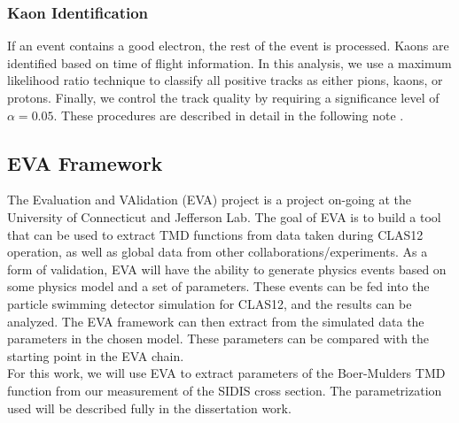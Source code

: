 \subsubsection{Kaon Identification}
If an event contains a good electron, the rest of the event is processed.  Kaons are identified based on time of flight information.  In this analysis, we use a maximum likelihood ratio technique to classify all positive tracks as either pions, kaons, or protons.  Finally, we control the track quality by requiring a significance level of $\alpha = 0.05$.  These procedures are described in detail in the following note \cite{kaon-note}.

\subsection{EVA Framework}
The Evaluation and VAlidation (EVA) project is a project on-going at the University of Connecticut and Jefferson Lab.  The goal of EVA is to build a tool that can be used to extract TMD functions from data taken during CLAS12 operation, as well as global data from other collaborations/experiments.  As a form of validation, EVA will have the ability to generate physics events based on some physics model and a set of parameters.  These events can be fed into the particle swimming detector simulation for CLAS12, and the results can be analyzed.  The EVA framework can then extract from the simulated data the parameters in the chosen model.  These parameters can be compared with the starting point in the EVA chain. \\

For this work, we will use EVA to extract parameters of the Boer-Mulders TMD function from our measurement of the SIDIS cross section.  The parametrization used will be described fully in the dissertation work.
